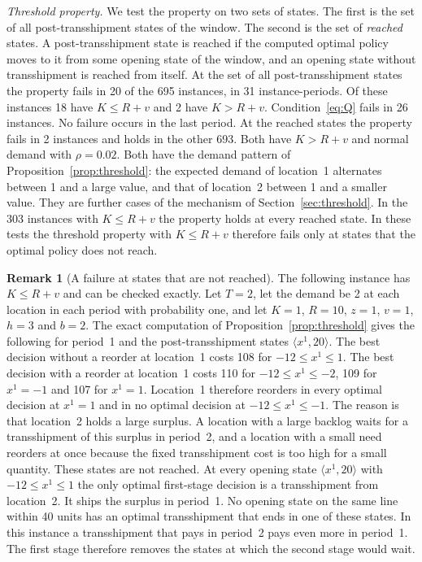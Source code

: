 \documentclass[11pt]{article}
\theoremstyle{definition}
\newtheorem{remark}{Remark}
\begin{document}
\emph{Threshold property.} We test the property on two sets of states. The first is the set of all post-transshipment states of the window. The second is the set of \emph{reached} states. A post-transshipment state is reached if the computed optimal policy moves to it from some opening state of the window, and an opening state without transshipment is reached from itself.
At the set of all post-transshipment states the property fails in 20 of the 695 instances, in 31 instance-periods. Of these instances 18 have $K\le R+v$ and 2 have $K>R+v$. Condition~\eqref{eq:Q} fails in 26 instances. No failure occurs in the last period. At the reached states the property fails in 2 instances and holds in the other 693. Both have $K>R+v$ and normal demand with $\rho=0.02$. Both have the demand pattern of Proposition~\ref{prop:threshold}: the expected demand of location~1 alternates between 1 and a large value, and that of location~2 between 1 and a smaller value. They are further cases of the mechanism of Section~\ref{sec:threshold}. In the 303 instances with $K\le R+v$ the property holds at every reached state. In these tests the threshold property with $K\le R+v$ therefore fails only at states that the optimal policy does not reach.

\begin{remark}[A failure at states that are not reached]\label{obs:unreached}
The following instance has $K\le R+v$ and can be checked exactly. Let $T=2$, let the demand be 2 at each location in each period with probability one, and let $K=1$, $R=10$, $z=1$, $v=1$, $h=3$ and $b=2$. The exact computation of Proposition~\ref{prop:threshold} gives the following for period~1 and the post-transshipment states $\langle x^1,20\rangle$. The best decision without a reorder at location~1 costs 108 for $-12\le x^1\le1$. The best decision with a reorder at location~1 costs 110 for $-12\le x^1\le-2$, 109 for $x^1=-1$ and 107 for $x^1=1$. Location~1 therefore reorders in every optimal decision at $x^1=1$ and in no optimal decision at $-12\le x^1\le-1$. The reason is that location~2 holds a large surplus. A location with a large backlog waits for a transshipment of this surplus in period~2, and a location with a small need reorders at once because the fixed transshipment cost is too high for a small quantity. These states are not reached. At every opening state $\langle x^1,20\rangle$ with $-12\le x^1\le1$ the only optimal first-stage decision is a transshipment from location~2. It ships the surplus in period~1. No opening state on the same line within 40 units has an optimal transshipment that ends in one of these states. In this instance a transshipment that pays in period~2 pays even more in period~1. The first stage therefore removes the states at which the second stage would wait.
\end{remark}
\end{document}
